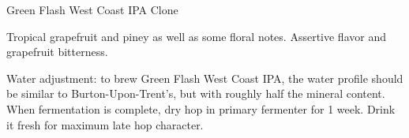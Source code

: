 \begin{recipe}{Green Flash West Coast IPA Clone}

\begin{aboutblock}
Tropical grapefruit and piney as well as some floral notes. Assertive flavor
and grapefruit bitterness. 
\end{aboutblock}


\begin{methodandtiming}
 
\begin{mashsteps}
\end{mashsteps}

\begin{fermentationsteps}
\end{fermentationsteps}

\begin{directions}
Water adjustment: to brew Green Flash West Coast IPA, the water profile should
be similar to Burton-Upon-Trent's, but with roughly half the mineral content.
When fermentation is complete, dry hop in primary fermenter for 1 week.
Drink it fresh for maximum late hop character.
\end{directions}

\end{methodandtiming}

\recipebreak

\begin{ingredientsblock}

\begin{malts}
\end{malts}

\begin{hops}
\end{hops}


\end{ingredientsblock}
\end{recipe}
